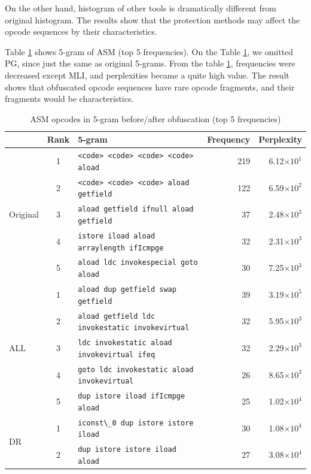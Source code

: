 \documentclass[conference]{IEEEtran}
\begin{document}
On the other hand, histogram of other tools is dramatically different
from original histogram.  The results show that the protection methods
may affect the opcode sequences by their characteristics.

Table \ref{table:5gram} shows 5-gram of ASM (top 5 frequencies).  On
the Table \ref{table:5gram}, we omitted PG, since just the same as
original 5-grams.  From the table \ref{table:5gram}, frequencies were
decreased except MLI, and perplexities became a quite high value.  The
result shows that obfuscated opcode sequences have rare opcode
fragments, and their fragments would be characteristics.

\begin{table}[t]
  \centering
  \caption{ASM opcodes in 5-gram before/after obfuscation (top 5 frequencies)}\label{table:5gram}
  {\footnotesize
  \begin{tabular}{lc|l|r|r}
    & \textbf{Rank} & \textbf{5-gram} & \textbf{Frequency} & \textbf{Perplexity} \\ \hline
\multirow{5}{*}{{Original}}
& 1 & \verb!<code> <code> <code> <code> aload       ! &  219 & 6.12$\times10^1$ \\
& 2 & \verb!<code> <code> <code> aload getfield     ! &  122 & 6.59$\times10^2$ \\
& 3 & \verb!aload getfield ifnull aload getfield    ! &   37 & 2.48$\times10^3$ \\
& 4 & \verb!istore iload aload arraylength ifIcmpge ! &   32 & 2.31$\times10^3$ \\
& 5 & \verb!aload ldc invokespecial goto aload      ! &   30 & 7.25$\times10^3$ \\ \hline
\multirow{5}{*}{{ALL}}
& 1 & \verb!aload dup getfield swap getfield              ! &  39 & 3.19$\times10^5$ \\
& 2 & \verb!aload getfield ldc invokestatic invokevirtual ! &  32 & 5.95$\times10^3$ \\
& 3 & \verb!ldc invokestatic aload invokevirtual ifeq     ! &  32 & 2.29$\times10^3$ \\
& 4 & \verb!goto ldc invokestatic aload invokevirtual     ! &  26 & 8.65$\times10^3$ \\
& 5 & \verb!dup istore iload ifIcmpge aload               ! &  25 & 1.02$\times10^4$ \\ \hline
\multirow{5}{*}{{DR}}
& 1 & \verb!iconst\_0 dup istore istore iload       ! & 30 & 1.08$\times10^4$ \\
& 2 & \verb!dup istore istore iload aload         ! & 27 & 3.08$\times10^4$ \\

\end{tabular}}
\end{table}
\end{document}
